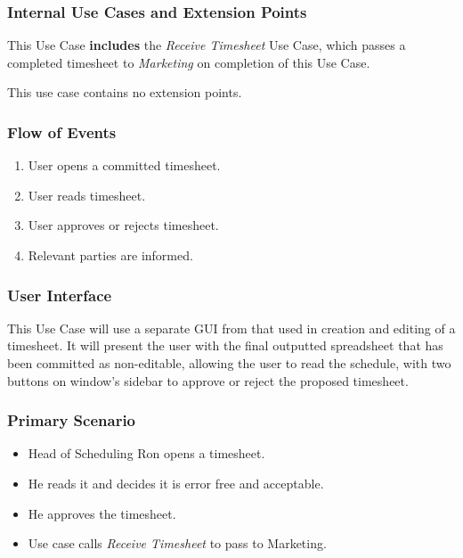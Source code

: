 \documentclass[11pt, oneside]{article}
\begin{document}
\subsubsection*{Internal Use Cases and Extension Points}
This Use Case \textbf{includes} the \textit{Receive Timesheet} Use Case, which passes a completed timesheet to \textit{Marketing} on completion of this Use Case.

This use case contains no extension points.
\subsubsection*{Flow of Events}
\begin{enumerate}
\item User opens a committed timesheet.
\item User reads timesheet.
\item User approves or rejects timesheet.
\item Relevant parties are informed.
\end{enumerate}
\subsubsection*{User Interface}
This Use Case will use a separate GUI from that used in creation and editing of a timesheet. It will present the user with the final outputted spreadsheet that has been committed as non-editable, allowing the user to read the schedule, with two buttons on window's sidebar to approve or reject the proposed timesheet.
\subsubsection*{Primary Scenario}
\begin{itemize}
\renewcommand\labelitemi{--}
\item Head of Scheduling Ron opens a timesheet.
\item He reads it and decides it is error free and acceptable.
\item He approves the timesheet.
\item Use case calls \textit{Receive Timesheet} to pass to Marketing.
\end{itemize}
\end{document}
